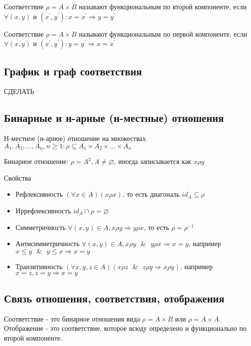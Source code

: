 \documentclass{report}
\newcommand{\band}{\mbox{ } \& \mbox{ }}
\begin{document}
Соответствие $\rho = A \times B$ называют функциональным по второй компоненте,
если $\forall (x,y)$ и $(x^\prime, y^\prime): x = x^\prime \Rightarrow y = y^\prime$

\medskip

Соответствие $\rho = A \times B$ называют функциональным по первой компоненте,
если $\forall (x,y)$ и $(x^\prime, y^\prime): y = y^\prime \Rightarrow x = x^\prime$

\subsection{График и граф соответствия}
СДЕЛАТЬ

\subsection{Бинарные и н-арные (н-местные) отношения}

Н-местное (н-арное) отношение на множествах $A_1, A_2, \ldots, A_n, n \geq 1: \rho \subseteq A_1 \times A_2 \times \ldots \times A_n$

Бинарное отношение: $\rho = A^2, A \neq \varnothing$, иногда записывается как $x\rho y$

\medskip

Свойства
\begin{itemize}
	\item Рефлексивность\newline
	      $(\forall x \in A)(x\rho x)$, то есть диагональ $id_A \subseteq \rho$
	\item Иррефлексивность\newline
	      $id_A \cap \rho = \varnothing$
	\item Симметричность\newline
	      $\forall (x,y) \in A, x\rho y \Rightarrow y\rho x$, то есть $\rho = \rho^{-1}$
	\item  Антисимметричность\newline
	      $\forall (x,y) \in A, x\rho y \band y\rho x \Rightarrow x = y$, например $x \leq y \band y \leq x \Rightarrow x = y$
	\item Транзитивность\newline
	      $(\forall x,y,z \in A)(x\rho z \band z\rho y \Rightarrow x\rho y)$, например $x = z, z = y \Rightarrow x = y$
\end{itemize}

\subsection{Связь отношения, соответствия, отображения}
Соответствие - это бинарное отношения вида $\rho = A \times B$ или $\rho = A \times A$.
Отображение - это соответствие, которое всюду определено и функционально по второй компоненте.
\end{document}
